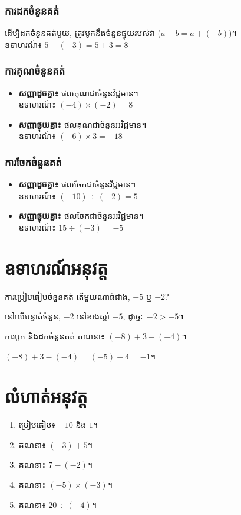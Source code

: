 \subsubsection{ការដកចំនួនគត់}
ដើម្បីដកចំនួនគត់មួយ, ត្រូវបូកនឹងចំនួនផ្ទុយរបស់វា ($a - b = a + (-b)$)។\\
ឧទាហរណ៍៖ $5 - (-3) = 5 + 3 = 8$

\subsubsection{ការគុណចំនួនគត់}
\begin{itemize}[label=-]
    \item \textbf{សញ្ញាដូចគ្នា៖} ផលគុណជាចំនួនវិជ្ជមាន។\\
    ឧទាហរណ៍៖ $(-4) \times (-2) = 8$
    \item \textbf{សញ្ញាផ្ទុយគ្នា៖} ផលគុណជាចំនួនអវិជ្ជមាន។\\
    ឧទាហរណ៍៖ $(-6) \times 3 = -18$
\end{itemize}

\subsubsection{ការចែកចំនួនគត់}
\begin{itemize}[label=-]
    \item \textbf{សញ្ញាដូចគ្នា៖} ផលចែកជាចំនួនវិជ្ជមាន។\\
    ឧទាហរណ៍៖ $(-10) \div (-2) = 5$
    \item \textbf{សញ្ញាផ្ទុយគ្នា៖} ផលចែកជាចំនួនអវិជ្ជមាន។\\
    ឧទាហរណ៍៖ $15 \div (-3) = -5$
\end{itemize}

\section{ឧទាហរណ៍អនុវត្ត}

\begin{example}{ការប្រៀបធៀបចំនួនគត់}
    តើមួយណាធំជាង, $-5$ ឬ $-2$?
    \begin{solution}
        នៅលើបន្ទាត់ចំនួន, $-2$ នៅខាងស្តាំ $-5$, ដូច្នេះ $-2 > -5$។
    \end{solution}
\end{example}

\begin{example}{ការបូក និងដកចំនួនគត់}
    គណនា៖ $(-8) + 3 - (-4)$។
    \begin{solution}
        $(-8) + 3 - (-4) = (-5) + 4 = -1$។
    \end{solution}
\end{example}

\section{លំហាត់អនុវត្ត}
\begin{enumerate}[label=\arabic*.]
    \item ប្រៀបធៀប៖ $-10$ និង $1$។
    \item គណនា៖ $(-3) + 5$។
    \item គណនា៖ $7 - (-2)$។
    \item គណនា៖ $(-5) \times (-3)$។
    \item គណនា៖ $20 \div (-4)$។
\end{enumerate}
